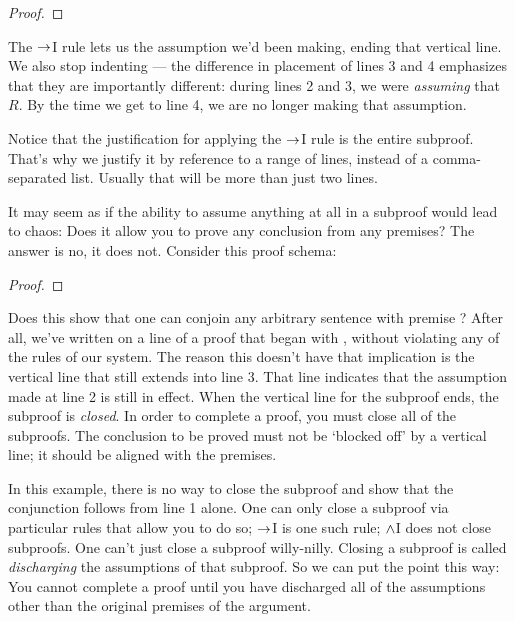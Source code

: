 \begin{proof}
	\open
	\close
\end{proof}

The $\rightarrow$I rule lets us  the assumption we'd been making, ending that vertical line. We also stop indenting --- the difference in placement of lines 3 and 4 emphasizes that they are importantly different: during lines 2 and 3, we were \emph{assuming} that \enot $R$. By the time we get to line 4, we are no longer making that assumption.

Notice that the justification for applying the $\rightarrow$I rule is the entire subproof. That's why we justify it by reference to a range of lines, instead of a comma-separated list. Usually that will be more than just two lines.

It may seem as if the ability to assume anything at all in a subproof would lead to chaos: Does it allow you to prove any conclusion from any premises? The answer is no, it does not. Consider this proof schema:

\begin{proof}
	\metaA{}
	\open
		\metaB{}
		 
	\close
\end{proof}

Does this show that one can conjoin any arbitrary sentence \metaB{} with premise \metaA{}? After all, we've written \metaB{}\eand\metaA{} on a line of a proof that began with \metaA{}, without violating any of the rules of our system. The reason this doesn't have that implication is the vertical line that still extends into line 3. That line indicates that the assumption made at line 2 is still in effect. When the vertical line for the subproof ends, the subproof is \emph{closed}. In order to complete a proof, you must close all of the subproofs. The conclusion to be proved must not be `blocked off' by a vertical line; it should be aligned with the premises.

In this example, there is no way to close the subproof and show that the conjunction follows from line 1 alone. One can only close a subproof via particular rules that allow you to do so; $\rightarrow$I is one such rule; $\wedge$I does not close subproofs. One can't just close a subproof willy-nilly. Closing a subproof is called \emph{discharging} the assumptions of that subproof. So we can put the point this way: You cannot complete a proof until you have discharged all of the assumptions other than the original premises of the argument.

